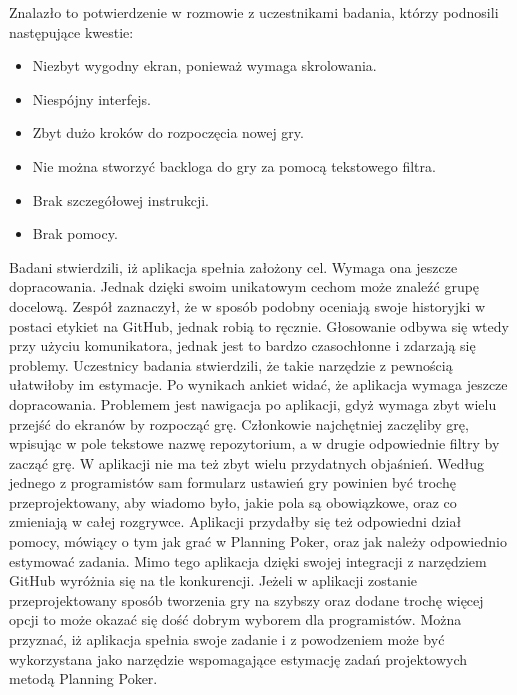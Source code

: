 Znalazło to potwierdzenie w rozmowie z uczestnikami badania, którzy podnosili następujące kwestie:
\begin{itemize}
    \item Niezbyt wygodny ekran, ponieważ wymaga skrolowania.
    \item Niespójny interfejs.
    \item Zbyt dużo kroków do rozpoczęcia nowej gry.
    \item Nie można stworzyć backloga do gry za pomocą tekstowego filtra.
    \item Brak szczegółowej instrukcji.
    \item Brak pomocy.
\end{itemize}
Badani stwierdzili, iż aplikacja spełnia założony cel. Wymaga ona jeszcze dopracowania. Jednak dzięki
swoim unikatowym cechom może znaleźć grupę docelową.
Zespół zaznaczył, że w sposób podobny oceniają swoje historyjki w postaci etykiet na GitHub, jednak
robią to ręcznie. Głosowanie odbywa się wtedy przy użyciu komunikatora, jednak jest to bardzo czasochłonne i
zdarzają się problemy. Uczestnicy badania stwierdzili, że takie narzędzie z pewnością ułatwiłoby im estymacje.
Po wynikach ankiet widać, że aplikacja wymaga jeszcze dopracowania. Problemem jest nawigacja po
aplikacji, gdyż wymaga zbyt wielu przejść do ekranów by rozpocząć grę. Członkowie najchętniej zaczęliby grę,
wpisując w pole tekstowe nazwę repozytorium, a w drugie odpowiednie filtry by zacząć grę. W aplikacji nie ma
też zbyt wielu przydatnych objaśnień. Według jednego z programistów sam formularz ustawień gry powinien
być trochę przeprojektowany, aby wiadomo było, jakie pola są obowiązkowe, oraz co zmieniają w całej
rozgrywce.
Aplikacji przydałby się też odpowiedni dział pomocy, mówiący o tym jak grać w Planning Poker, oraz jak
należy odpowiednio estymować zadania. Mimo tego aplikacja dzięki swojej integracji z narzędziem GitHub
wyróżnia się na tle konkurencji. Jeżeli w aplikacji zostanie przeprojektowany sposób tworzenia gry na szybszy
oraz dodane trochę więcej opcji to może okazać się dość dobrym wyborem dla programistów.
Można przyznać, iż aplikacja spełnia swoje zadanie i z powodzeniem może być wykorzystana jako
narzędzie wspomagające estymację zadań projektowych metodą Planning Poker.
